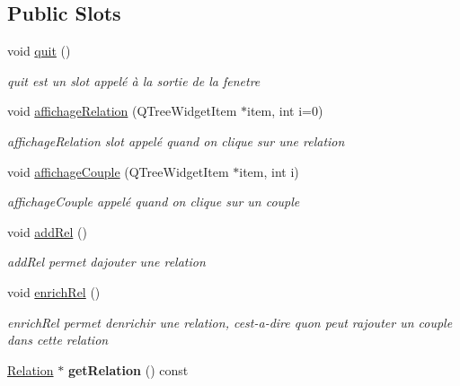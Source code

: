 \subsection*{Public Slots}
\begin{DoxyCompactItemize}
\item 
\mbox{\label{classRelationViewer_a9dea233145d67866160d7cab617e2986}} 
void \hyperlink{classRelationViewer_a9dea233145d67866160d7cab617e2986}{quit} ()
\begin{DoxyCompactList}\small\item\em quit est un slot appelé à la sortie de la fenetre \end{DoxyCompactList}\item 
void \hyperlink{classRelationViewer_ac357dab8075b96af014ad4dd70a1a7dd}{affichage\+Relation} (Q\+Tree\+Widget\+Item $\ast$item, int i=0)
\begin{DoxyCompactList}\small\item\em affichage\+Relation slot appelé quand on clique sur une relation \end{DoxyCompactList}\item 
void \hyperlink{classRelationViewer_ad0771f0bf9198b53ad8e0d77b4425e93}{affichage\+Couple} (Q\+Tree\+Widget\+Item $\ast$item, int i)
\begin{DoxyCompactList}\small\item\em affichage\+Couple appelé quand on clique sur un couple \end{DoxyCompactList}\item 
\mbox{\label{classRelationViewer_af5aa5728e902de2f6d25a4b68fff6493}} 
void \hyperlink{classRelationViewer_af5aa5728e902de2f6d25a4b68fff6493}{add\+Rel} ()
\begin{DoxyCompactList}\small\item\em add\+Rel permet d\textquotesingle{}ajouter une relation \end{DoxyCompactList}\item 
\mbox{\label{classRelationViewer_ad3fd7a4cd0c8deb9f7590d85ba84a4b7}} 
void \hyperlink{classRelationViewer_ad3fd7a4cd0c8deb9f7590d85ba84a4b7}{enrich\+Rel} ()
\begin{DoxyCompactList}\small\item\em enrich\+Rel permet d\textquotesingle{}enrichir une relation, c\textquotesingle{}est-\/a-\/dire qu\textquotesingle{}on peut rajouter un couple dans cette relation \end{DoxyCompactList}\item 
\mbox{\label{classRelationViewer_aa0eabc2876b5f079a647668ebc72ea0b}} 
\hyperlink{classRelation}{Relation} $\ast$ {\bfseries get\+Relation} () const
\end{DoxyCompactItemize}
